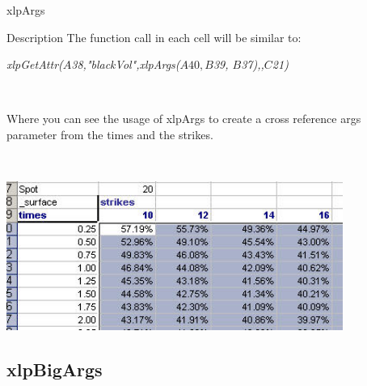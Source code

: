 \begin{xlpfunctitle}{xlpArgs}
\begin{xlpfunc}{Description}
The function call in each cell will be similar to:

\begin{center}
{\sl xlpGetAttr($A$38,"blackVol",xlpArgs($A40,B$39, $B$37),,$C$21)}
\end{center}

\

Where you can see the usage of xlpArgs to create a cross reference args parameter from the times and the strikes. 

\

\includegraphics[width=11cm]{images/surface3.jpg}
\end{xlpfunc}
\end{xlpfunctitle}


\subsection{xlpBigArgs}

